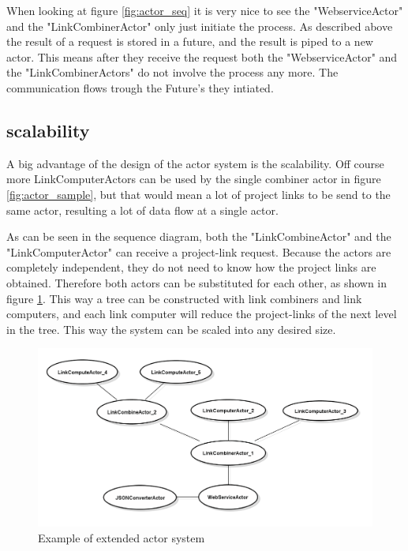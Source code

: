 \documentclass[10pt,a4paper]{article}
\begin{document}


When looking at figure \ref{fig:actor_seq} it is very nice to see the "WebserviceActor" and the "LinkCombinerActor" only just initiate the process. As described above the result of a request is stored in a future, and the result is piped to a new actor. This means after they receive the request both the "WebserviceActor" and the "LinkCombinerActors" do not involve the process any more. The communication flows trough the Future's they intiated.


\subsection{scalability}

A big advantage of the design of the actor system is the scalability. Off course more LinkComputerActors can be used by the single combiner actor in figure \ref{fig:actor_sample}, but that would mean a lot of project links to be send to the same actor, resulting a lot of data flow at a single actor. 

As can be seen in the sequence diagram, both the "LinkCombineActor" and the "LinkComputerActor" can receive a project-link request. Because the actors are completely independent, they do not need to know how the project links are obtained. Therefore both actors can be substituted for each other, as shown in figure \ref{fig:example_scalable}. This way a tree can be constructed with link combiners and link computers, and each link computer will reduce the project-links of the next level in the tree. This way the system can be scaled into any desired size.

\begin{figure}[htb]
    \centering
    \includegraphics[width=1.00\textwidth]{ActorSystemSampleExtended}
    \caption{Example of extended actor system}
    \label{fig:example_scalable}
\end{figure}
\end{document}
